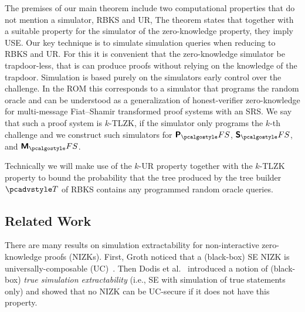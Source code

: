 The premises of our main theorem include two computational properties that do not mention a simulator, RBKS and UR, The theorem states that together with a suitable property for the simulator of the zero-knowledge property, they imply USE.
%
Our key technique is to simulate simulation queries when reducing to RBKS and UR. For this it is convenient that the zero-knowledge simulator be trapdoor-less, that is can produce proofs without relying on the
knowledge of the trapdoor. Simulation is based purely on the simulators early control over the challenge. 
%
In the ROM this corresponds to a simulator that programs the random oracle and can be understood as a generalization of
honest-verifier zero-knowledge for multi-message Fiat--Shamir transformed proof systems with an
SRS. We say that such a proof system is $k$-TLZK, if the simulator only programs the $k$-th challenge and we construct such simulators for $\plonkprotfs$, $\sonicprotfs$, and $\marlinprotfs$. 





Technically we will make use of the $k$-UR property together with the $k$-TLZK property to bound the probability that the tree produced by the tree builder $\tdv$ of RBKS contains any programmed random oracle queries.

\subsection{Related Work}
There are many results on simulation extractability for
non-interactive zero-knowledge proofs (NIZKs). First, Groth \cite{AC:Groth07}
noticed that a (black-box) SE NIZK is
universally-composable (UC)~\cite{EPRINT:Canetti00}. Then Dodis et al.~\cite{AC:DHLW10} introduced a
notion of (black-box) \emph{true simulation extractability} (i.e., SE with simulation of true statements only) and showed that no
NIZK can be UC-secure if it does not have this property. 

